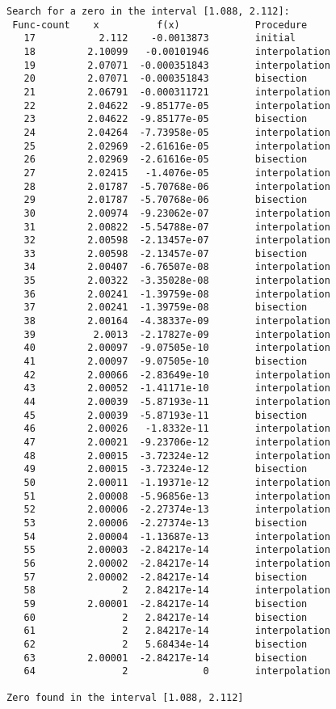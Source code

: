 \documentclass{article}
\begin{document}
\begin{verbatim}
Search for a zero in the interval [1.088, 2.112]:
 Func-count    x          f(x)             Procedure
   17           2.112    -0.0013873        initial
   18         2.10099   -0.00101946        interpolation
   19         2.07071  -0.000351843        interpolation
   20         2.07071  -0.000351843        bisection
   21         2.06791  -0.000311721        interpolation
   22         2.04622  -9.85177e-05        interpolation
   23         2.04622  -9.85177e-05        bisection
   24         2.04264  -7.73958e-05        interpolation
   25         2.02969  -2.61616e-05        interpolation
   26         2.02969  -2.61616e-05        bisection
   27         2.02415   -1.4076e-05        interpolation
   28         2.01787  -5.70768e-06        interpolation
   29         2.01787  -5.70768e-06        bisection
   30         2.00974  -9.23062e-07        interpolation
   31         2.00822  -5.54788e-07        interpolation
   32         2.00598  -2.13457e-07        interpolation
   33         2.00598  -2.13457e-07        bisection
   34         2.00407  -6.76507e-08        interpolation
   35         2.00322  -3.35028e-08        interpolation
   36         2.00241  -1.39759e-08        interpolation
   37         2.00241  -1.39759e-08        bisection
   38         2.00164  -4.38337e-09        interpolation
   39          2.0013  -2.17827e-09        interpolation
   40         2.00097  -9.07505e-10        interpolation
   41         2.00097  -9.07505e-10        bisection
   42         2.00066  -2.83649e-10        interpolation
   43         2.00052  -1.41171e-10        interpolation
   44         2.00039  -5.87193e-11        interpolation
   45         2.00039  -5.87193e-11        bisection
   46         2.00026   -1.8332e-11        interpolation
   47         2.00021  -9.23706e-12        interpolation
   48         2.00015  -3.72324e-12        interpolation
   49         2.00015  -3.72324e-12        bisection
   50         2.00011  -1.19371e-12        interpolation
   51         2.00008  -5.96856e-13        interpolation
   52         2.00006  -2.27374e-13        interpolation
   53         2.00006  -2.27374e-13        bisection
   54         2.00004  -1.13687e-13        interpolation
   55         2.00003  -2.84217e-14        interpolation
   56         2.00002  -2.84217e-14        interpolation
   57         2.00002  -2.84217e-14        bisection
   58               2   2.84217e-14        interpolation
   59         2.00001  -2.84217e-14        bisection
   60               2   2.84217e-14        bisection
   61               2   2.84217e-14        interpolation
   62               2   5.68434e-14        bisection
   63         2.00001  -2.84217e-14        bisection
   64               2             0        interpolation
 
Zero found in the interval [1.088, 2.112]
\end{verbatim}
\end{document}
